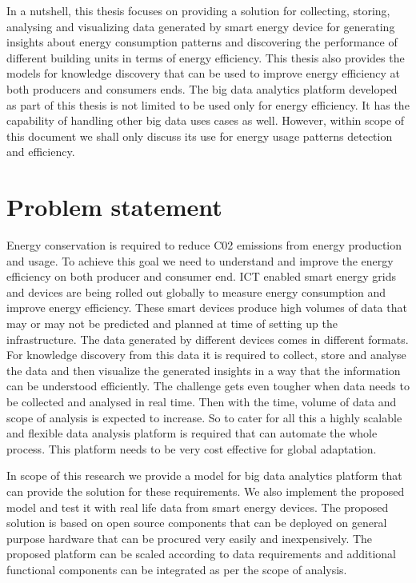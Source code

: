 In a nutshell, this thesis focuses on providing a solution for collecting, storing, analysing and visualizing data generated by smart energy device for generating insights about energy consumption patterns and discovering the performance of different building units in terms of energy efficiency. This thesis also provides the models for knowledge discovery that can be used to improve energy efficiency at both producers and consumers ends. The big data analytics platform developed as part of this thesis is not limited to be used only for energy efficiency. It has the capability of handling other big data uses cases as well. However, within scope of this document we shall only discuss its use for energy usage patterns detection and efficiency.     





\section{Problem statement}

Energy conservation is required to reduce C02 emissions from energy production and usage. To achieve this goal we need to understand and improve the energy efficiency on both producer and consumer end. ICT enabled smart energy grids and devices are being rolled out globally to measure energy consumption and improve energy efficiency. These smart devices produce high volumes of data that may or may not be predicted and planned at time of setting up the infrastructure. The data generated by different devices comes in different formats. For knowledge discovery from this data it is required to collect, store and analyse the data and then visualize the generated insights in a way that the information can be understood efficiently. The challenge gets even tougher when data needs to be collected and analysed in real time. Then with the time, volume of data and scope of analysis is expected to increase. So to cater for all this a highly scalable and flexible data analysis platform is required that can automate the whole process. This platform needs to be very cost effective for global adaptation.
 
In scope of this research we provide a model for big data analytics platform that can provide the solution for these requirements. We also implement the proposed model and test it with real life data from smart energy devices. The proposed solution is based on open source components that can be deployed on general purpose hardware that can be procured very easily and inexpensively. The proposed platform can be scaled according to data requirements and additional functional components can be integrated as per the scope of analysis.


